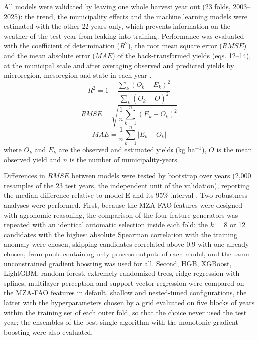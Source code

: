 \documentclass[10pt,a4paper]{article}
\begin{document}
All models were validated by leaving one whole harvest year out (23 folds, 2003--2025): the trend, the
municipality effects and the machine learning models were estimated with the other 22 years only, which
prevents information on the weather of the test year from leaking into training. Performance was
evaluated with the coefficient of determination ($R^2$), the root mean square error ($RMSE$) and the
mean absolute error ($MAE$) of the back-transformed yields (eqs. 12--14), at the municipal scale and
after averaging observed and predicted yields by microregion, mesoregion and state in each year
\citep{roberts2017, kapoor2023}.
\begin{equation}
R^2 = 1 - \frac{\sum_{k}(O_k - E_k)^2}{\sum_{k}(O_k - \bar{O})^2}
\label{eq:r2}
\end{equation}
\begin{equation}
RMSE = \sqrt{\frac{1}{n}\sum_{k=1}^{n}(E_k - O_k)^2}
\label{eq:rmse}
\end{equation}
\begin{equation}
MAE = \frac{1}{n}\sum_{k=1}^{n}\lvert E_k - O_k \rvert
\label{eq:mae}
\end{equation}
where $O_k$ and $E_k$ are the observed and estimated yields (kg ha$^{-1}$), $\bar{O}$ is the mean
observed yield and $n$ is the number of municipality-years.

Differences in $RMSE$ between models were tested by bootstrap over years (2,000 resamples of the 23 test
years, the independent unit of the validation), reporting the median difference relative to model E and
its 95\% interval \citep{efron1993}. Two robustness analyses were performed. First, because the MZA-FAO
features were designed with agronomic reasoning, the comparison of the four feature generators was
repeated with an identical automatic selection inside each fold: the $k$ = 8 or 12 candidates with the
highest absolute Spearman correlation with the training anomaly were chosen, skipping candidates
correlated above 0.9 with one already chosen, from pools containing only process outputs of each model,
and the same unconstrained gradient boosting was used for all. Second, HGB, XGBoost, LightGBM, random
forest, extremely randomized trees, ridge regression with splines, multilayer perceptron and support
vector regression were compared on the MZA-FAO features in default, shallow and nested-tuned
configurations, the latter with the hyperparameters chosen by a grid evaluated on five blocks of years
within the training set of each outer fold, so that the choice never used the test year; the ensembles of
the best single algorithm with the monotonic gradient boosting were also evaluated.
\end{document}
